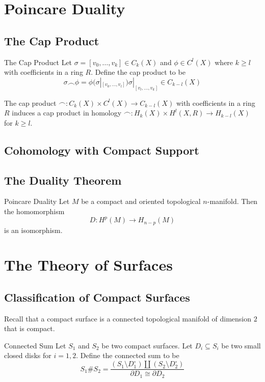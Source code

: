 \documentclass[a4paper]{article}
\begin{document}
\pagebreak
\section{Poincare Duality}
\subsection{The Cap Product}
\begin{defn}{The Cap Product}{} Let $\sigma=[v_0,\dots,v_k]\in C_k(X)$ and $\phi\in C^l(X)$ where $k\geq l$ with coefficients in a ring $R$. Define the cap product to be $$\sigma\frown\phi=\phi(\sigma|_{[v_0,\dots,v_l]})\sigma|_{[v_l,\dots,v_k]}\in C_{k-l}(X)$$
\end{defn}

\begin{lmm}{}{} The cap product $\frown: C_k(X)\times C^l(X)\to C_{k-l}(X)$ with coefficients in a ring $R$ induces a cap product in homology $\frown: H_k(X)\times H^l(X,R)\to H_{k-l}(X)$ for $k\geq l$. 
\end{lmm}

\subsection{Cohomology with Compact Support}

\subsection{The Duality Theorem}
\begin{thm}{Poincare Duality}{} Let $M$ be a compact and oriented topological $n$-manifold. Then the homomorphism $$D:H^p(M)\to H_{n-p}(M)$$ is an isomorphism. 
\end{thm}

\pagebreak
\section{The Theory of Surfaces}
\subsection{Classification of Compact Surfaces}
Recall that a compact surface is a connected topological manifold of dimension $2$ that is compact. 

\begin{defn}{Connected Sum}{} Let $S_1$ and $S_2$ be two compact surfaces. Let $D_i\subseteq S_i$ be two small closed disks for $i=1,2$. Define the connected sum to be $$S_1\# S_2=\frac{(S_1\setminus D_1^\circ)\amalg(S_2\setminus D_2^\circ)}{\partial D_1\cong\partial D_2}$$
\end{defn}
\end{document}
